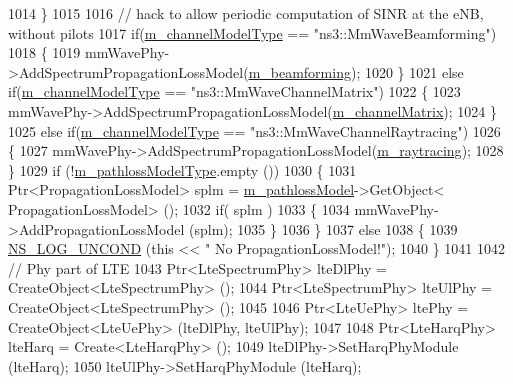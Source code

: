 \begin{DoxyCode}
1014         \}
1015 
1016         \textcolor{comment}{// hack to allow periodic computation of SINR at the eNB, without pilots}
1017         \textcolor{keywordflow}{if}(\hyperlink{classns3_1_1MmWaveHelper_aec88d691230f0db9448a7f953301bb24}{m\_channelModelType} == \textcolor{stringliteral}{"ns3::MmWaveBeamforming"})
1018         \{
1019                 mmWavePhy->AddSpectrumPropagationLossModel(\hyperlink{classns3_1_1MmWaveHelper_a4fa071b6d755f32a684906150660b381}{m\_beamforming});
1020         \}
1021         \textcolor{keywordflow}{else} \textcolor{keywordflow}{if}(\hyperlink{classns3_1_1MmWaveHelper_aec88d691230f0db9448a7f953301bb24}{m\_channelModelType} == \textcolor{stringliteral}{"ns3::MmWaveChannelMatrix"})
1022         \{
1023                 mmWavePhy->AddSpectrumPropagationLossModel(\hyperlink{classns3_1_1MmWaveHelper_a731a9e28a12edacd78b96800025db070}{m\_channelMatrix});
1024         \}
1025         \textcolor{keywordflow}{else} \textcolor{keywordflow}{if}(\hyperlink{classns3_1_1MmWaveHelper_aec88d691230f0db9448a7f953301bb24}{m\_channelModelType} == \textcolor{stringliteral}{"ns3::MmWaveChannelRaytracing"})
1026         \{
1027                 mmWavePhy->AddSpectrumPropagationLossModel(\hyperlink{classns3_1_1MmWaveHelper_a99e1ebbb84d122ea60a9fe7c1bb44528}{m\_raytracing});
1028         \}
1029         \textcolor{keywordflow}{if} (!\hyperlink{classns3_1_1MmWaveHelper_a7f17e9bc4797b51d9a31d16c7e667960}{m\_pathlossModelType}.empty ())
1030         \{
1031                 Ptr<PropagationLossModel> splm = \hyperlink{classns3_1_1MmWaveHelper_a4de60027f5a256fe51033e6d6803e9b0}{m\_pathlossModel}->GetObject<
      PropagationLossModel> ();
1032                 \textcolor{keywordflow}{if}( splm )
1033                 \{
1034                         mmWavePhy->AddPropagationLossModel (splm);
1035                 \}
1036         \}
1037         \textcolor{keywordflow}{else}
1038         \{
1039                 \hyperlink{log-macros-disabled_8h_a0b36e5e182b37194f85ef1c5e979fb2e}{NS\_LOG\_UNCOND} (\textcolor{keyword}{this} << \textcolor{stringliteral}{" No PropagationLossModel!"});
1040         \}
1041 
1042         \textcolor{comment}{// Phy part of LTE}
1043         Ptr<LteSpectrumPhy> lteDlPhy = CreateObject<LteSpectrumPhy> ();
1044         Ptr<LteSpectrumPhy> lteUlPhy = CreateObject<LteSpectrumPhy> ();
1045 
1046         Ptr<LteUePhy> ltePhy = CreateObject<LteUePhy> (lteDlPhy, lteUlPhy);
1047 
1048         Ptr<LteHarqPhy> lteHarq = Create<LteHarqPhy> ();
1049         lteDlPhy->SetHarqPhyModule (lteHarq);
1050         lteUlPhy->SetHarqPhyModule (lteHarq);

\end{DoxyCode}
